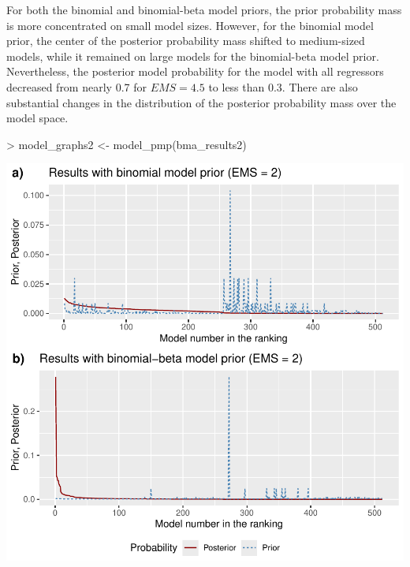 \documentclass[a4paper]{article}
\begin{document}
For both the binomial and binomial-beta model priors, the prior probability mass is more concentrated on small model sizes.
However, for the binomial model prior, the center of the posterior probability mass shifted to medium-sized models, while it remained on large models for the binomial-beta model prior.
Nevertheless, the posterior model probability for the model with all regressors decreased from nearly 0.7 for $EMS = 4.5$ to less than 0.3.
There are also substantial changes in the distribution of the posterior probability mass over the model space.
\begin{Schunk}
\begin{Sinput}
> model_graphs2 <- model_pmp(bma_results2)
\end{Sinput}
\end{Schunk}
\includegraphics{bdsm_vignette-029}
\end{document}
